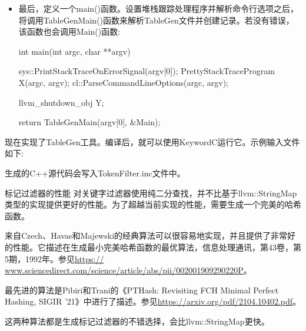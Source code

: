 \begin{itemize}
\item
最后，定义一个main()函数。设置堆栈跟踪处理程序并解析命令行选项之后，将调用TableGenMain()函数来解析TableGen文件并创建记录。若没有错误，该函数也会调用Main()函数:

\begin{cpp}
int main(int argc, char **argv) {
    sys::PrintStackTraceOnErrorSignal(argv[0]);
    PrettyStackTraceProgram X(argc, argv);
    cl::ParseCommandLineOptions(argc, argv);

    llvm_shutdown_obj Y;

    return TableGenMain(argv[0], &Main);
}
\end{cpp}

\end{itemize}

现在实现了TableGen工具。编译后，就可以使用KeywordC运行它。示例输入文件如下:


生成的C++源代码会写入TokenFilter.inc文件中。

\begin{myTip}{标记过滤器的性能}
对关键字过滤器使用纯二分查找，并不比基于llvm::StringMap类型的实现提供更好的性能。为了超越当前实现的性能，需要生成一个完美的哈希函数。

来自Czech、Havas和Majewski的经典算法可以很容易地实现，并且提供了非常好的性能。它描述在生成最小完美哈希函数的最优算法，信息处理通讯，第43卷，第5期，1992年。参见\url{https:// www.sciencedirect.com/science/article/abs/pii/002001909290220P}。

最先进的算法是Pibiri和Trani的《PTHash: Revisiting FCH Minimal Perfect Hashing, SIGIR ’21》中进行了描述。参见\url{https://arxiv.org/pdf/2104.10402.pdf}。

这两种算法都是生成标记过滤器的不错选择，会比llvm::StringMap更快。
\end{myTip}




















